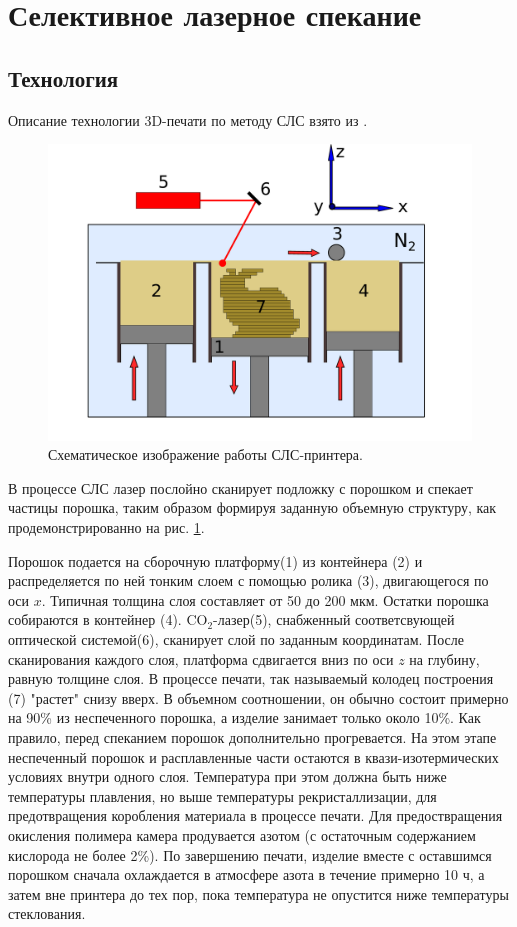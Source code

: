 \section{Селективное лазерное спекание}


\subsection{Технология}

Описание технологии 3D-печати по методу СЛС взято из \cite{sls-material, ageing}.

\begin{figure}[ht]
    \centering
    \includegraphics[width=\linewidth]{fig/sls-2d.pdf}
    \caption{Схематическое изображение работы СЛС-принтера.}
    \label{fig:printer}
\end{figure}


В процессе СЛС лазер послойно сканирует подложку с порошком и спекает частицы порошка, таким образом формируя заданную объемную структуру, как продемонстрированно на рис. \ref{fig:printer}. 

Порошок подается на сборочную платформу(1) из контейнера (2) и распределяется по ней тонким слоем с помощью ролика (3), двигающегося по оси $x$. Типичная толщина слоя составляет от 50 до 200 мкм. Остатки порошка собираются в контейнер (4).
CO$_2$-лазер(5), снабженный соответсвующей оптической системой(6), сканирует слой по заданным координатам.
После сканирования каждого слоя, платформа сдвигается вниз по оси $z$ на глубину, равную толщине слоя. В процессе печати, так называемый колодец построения (7) "растет" снизу вверх. В объемном соотношении, он обычно состоит примерно на 90\% из неспеченного порошка, а изделие занимает только около 10\%. 
Как правило, перед спеканием порошок дополнительно прогревается.
На этом этапе неспеченный порошок и расплавленные части остаются в квази-изотермических условиях внутри одного слоя.
Температура при этом должна быть ниже температуры плавления, но выше температуры рекристаллизации, для предотвращения коробления материала в процессе печати.
Для предоствращения окисления полимера камера продувается азотом (с остаточным содержанием кислорода не более 2\%). По завершению печати, изделие вместе с оставшимся порошком сначала охлаждается в атмосфере азота в течение примерно 10 ч, а затем вне принтера до тех пор, пока температура не опустится ниже температуры стеклования.

